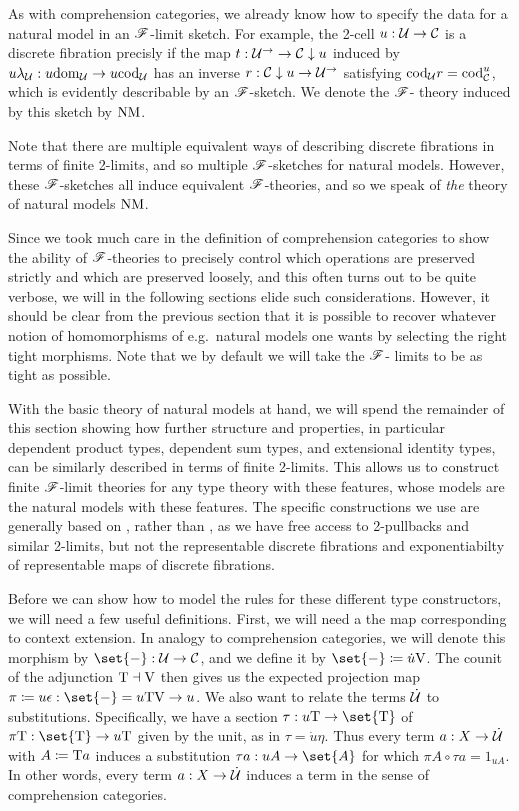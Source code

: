 \documentclass[../thesis.tex]{subfiles}
\begin{document}
As with comprehension categories, we already know how to specify the data for a natural model in an ${\mathscr{F}}$-limit
sketch. For example, the 2-cell $u : {\mathcal{U}} \to {\mathcal{C}}$ is a discrete fibration precisly if the map $t : {\mathcal{U}}^\to \to
{\mathcal{C}} \mathrel{\downarrow} u$ induced by $u \lambda_{\mathcal{U}} : u{\mathrm{dom}}_{\mathcal{U}} \to u{\mathrm{cod}}_{\mathcal{U}}$ has an inverse $r : {\mathcal{C}} \mathrel{\downarrow} u \to {\mathcal{U}}^\to$
satisfying ${\mathrm{cod}}_{\mathcal{U}} r = {\mathrm{cod}}_{\mathcal{C}}^u$, which is evidently describable by an ${\mathscr{F}}$-sketch. We denote the ${\mathscr{F}}$-%
theory induced by this sketch by ${\mathrm{NM}}$.
\begin{remark}
  Note that there are multiple equivalent ways of describing discrete fibrations in terms of finite 2-limits, and
  so multiple ${\mathscr{F}}$-sketches for natural models. However, these ${\mathscr{F}}$-sketches all induce equivalent ${\mathscr{F}}$-theories,
  and so we speak of \emph{the} theory of natural models ${\mathrm{NM}}$.
\end{remark}
\begin{remark}
  Since we took much care in the definition of comprehension categories to show the ability of ${\mathscr{F}}$-theories
  to precisely control which operations are preserved strictly and which are preserved loosely, and this often
  turns out to be quite verbose, we will in the following sections elide such considerations. However, it should
  be clear from the previous section that it is possible to recover whatever notion of homomorphisms of e.g.\
  natural models one wants by selecting the right tight morphisms. Note that we by default we will take the ${\mathscr{F}}$-%
  limits to be as tight as possible.
\end{remark}


With the basic theory of natural models at hand, we will spend the remainder of this section showing how further
structure and properties, in particular dependent product types, dependent sum types, and extensional identity types,
can be similarly described in terms of finite 2-limits. This allows us to construct finite ${\mathscr{F}}$-limit theories
for any type theory with these features, whose models are the natural models with these features. The specific
constructions we use are generally based on \cite{coraglia2024a}, rather than \cite{awodey2017}, as we have free
access to 2-pullbacks and similar 2-limits, but not the representable discrete fibrations and exponentiabilty of
representable maps of discrete fibrations.

Before we can show how to model the rules for these different type constructors, we will need a few useful definitions.
First, we will need a the map corresponding to context extension. In analogy to comprehension categories, we will denote
this morphism by $\set{-} : \cU \to \cC$, and we define it by $\set{-} \coloneq \dot u \var$. The counit of the adjunction
${{\mathrm{T}}} \dashv {{\mathrm{V}}}$ then gives us the expected projection map $\pi \coloneq u \epsilon : \set{-} = u\typ\var \to u$. We also
want to relate the terms $\dot{{\mathcal{U}}}$ to substitutions. Specifically, we have a section $\tau : u\typ \to \set{\typ}$ of $\pi
\typ : \set{\typ} \to u\typ$ given by the unit, as in $\tau = \dot u \eta$. Thus every term $a : X \to \dot{{\mathcal{U}}}$ with $A
\coloneq {{\mathrm{T}}} a$ induces a substitution $\tau a : uA \to \set{A}$ for which $\pi A \circ \tau a = 1_{u A}$. In other words,
every term $a : X \to \dot{{\mathcal{U}}}$ induces a term in the sense of comprehension categories.
\end{document}
